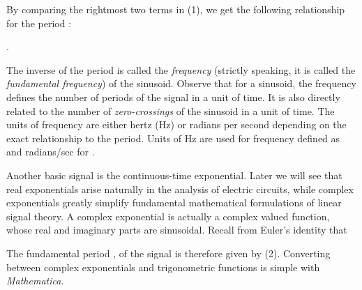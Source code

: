\documentclass{article}
\begin{document}
\begin{CellGroup}

By comparing the rightmost two terms in (1), we get the following relationship for the period :



.

The inverse of the period is called the {\itshape frequency} (strictly speaking, it is called the {\itshape fundamental frequency}) of the sinusoid.
Observe that for a sinusoid, the frequency defines the number of periods of the signal in a unit of time. It is also directly related to the number
of {\itshape zero-crossings} of the sinusoid in a unit of time. The units of frequency are either hertz (Hz) or radians per second depending on the
exact relationship to the period. Units of Hz are used for frequency defined as  and radians/sec for .



\begin{CellGroup}
Another basic signal is the continuous-time exponential. Later we will see that real exponentials arise naturally in the analysis of electric circuits,
while complex exponentials greatly simplify fundamental mathematical formulations of linear signal theory. A  complex exponential is actually a complex
valued function, whose real and imaginary parts are sinusoidal. Recall from Euler's identity that


 The fundamental period , of the signal  is therefore
given by (2). Converting between complex exponentials and trigonometric functions is simple with {\itshape Mathematica}.



\begin{CellGroup}


\end{CellGroup}
\end{CellGroup}
\end{CellGroup}
\end{document}
